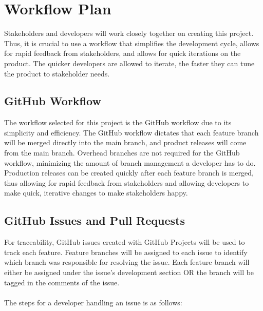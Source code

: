 \documentclass{article}
\begin{document}
\section{Workflow Plan}

Stakeholders and developers will work closely together on creating this project. Thus, it is crucial to use a workflow that simplifies the development cycle, allows for rapid feedback from stakeholders, and allows for quick iterations on the product. The quicker developers are allowed to iterate, the faster they can tune the product to stakeholder needs.

\subsection{GitHub Workflow}
The workflow selected for this project is the GitHub workflow due to its simplicity and efficiency. The GitHub workflow dictates that each feature branch will be merged directly into the main branch, and product releases will come from the main branch. Overhead branches are not required for the GitHub workflow, minimizing the amount of branch management a developer has to do. Production releases can be created quickly after each feature branch is merged, thus allowing for rapid feedback from stakeholders and allowing developers to make quick, iterative changes to make stakeholders happy. 

\subsection{GitHub Issues and Pull Requests}
For traceability, GitHub issues created with GitHub Projects will be used to track each feature. Feature branches will be assigned to each issue to identify which branch was responsible for resolving the issue. Each feature branch will either be assigned under the issue's development section OR the branch will be tagged in the comments of the issue.\\\\
The steps for a developer handling an issue is as follows:
\end{document}
